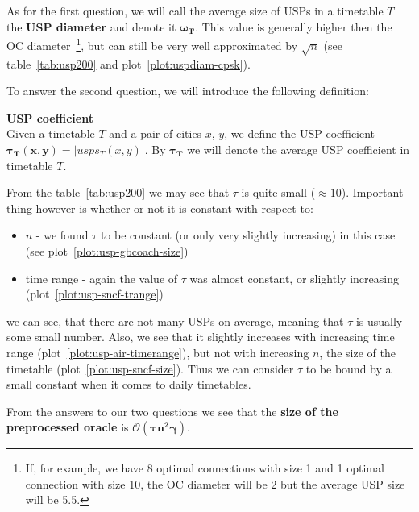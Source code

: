 		\noindent As for the first question, we will call the average size of USPs in a timetable $T$ the \textbf{USP diameter} and denote it $\bm{\omega_{T}}$. This value is generally higher then the OC diameter~\footnote{If, for example, we have 8 optimal connections with size 1 and 1 optimal connection with size 10, the OC diameter will be 2 but the average USP size will be 5.5.}, but can still be very well approximated by $\sqrt{n}$ (see table~\ref{tab:usp200} and plot~\ref{plot:uspdiam-cpsk}).
		
		To answer the second question, we will introduce the following definition:
		
		\begin{definition}
	        \textbf{USP coefficient} \\
			Given a timetable $T$ and a pair of cities $x$, $y$, we define the USP coefficient $\bm{\tau_{T}(x, y)} = |usps_{T}(x, y)|$. By $\bm{\tau_{T}}$ we will denote the average USP coefficient in timetable $T$.
	    \end{definition}
	    
	    \noindent From the table~\ref{tab:usp200} we may see that $\tau$ is quite small ($\approx 10$). Important thing however is whether or not it is constant with respect to:
		\begin{itemize}
			\item $n$ - we found $\tau$ to be constant (or only very slightly increasing) in this case (see plot~\ref{plot:usp-gbcoach-size})
			\item time range - again the value of $\tau$ was almost constant, or slightly increasing (plot~\ref{plot:usp-sncf-trange})
		\end{itemize}
		\hspace{\fill}
	    
	    
	    
	    
	    we can see, that there are not many USPs on average, meaning that $\tau$ is usually some small number. Also, we see that it slightly increases with increasing time range (plot~\ref{plot:usp-air-timerange}), but not with increasing $n$, the size of the timetable (plot~\ref{plot:usp-sncf-size}). Thus we can consider $\tau$ to be bound by a small constant when it comes to daily timetables. 
	    
	    From the answers to our two questions we see that the \textbf{size of the preprocessed oracle} is $\bm{\mathcal{O}(\tau n^{2} \gamma)}$.
	
